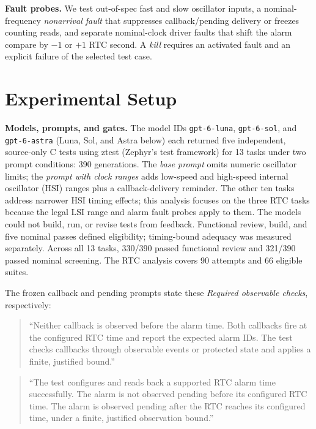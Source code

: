 \documentclass[sigconf,nonacm]{acmart}
\begin{document}
\textbf{Fault probes.} We test out-of-spec fast and slow oscillator inputs, a nominal-frequency \emph{nonarrival fault} that suppresses callback/pending delivery or freezes counting reads, and separate nominal-clock driver faults that shift the alarm compare by $-1$ or $+1$ RTC second. A \emph{kill} requires an activated fault and an explicit failure of the selected test case.

\section{Experimental Setup}

\textbf{Models, prompts, and gates.} The model IDs \texttt{gpt-6-luna}, \texttt{gpt-6-sol}, and \texttt{gpt-6-astra} (Luna, Sol, and Astra below) each returned five independent, source-only C tests using ztest (Zephyr's test framework) for 13 tasks under two prompt conditions: 390 generations. The \emph{base prompt} omits numeric oscillator limits; the \emph{prompt with clock ranges} adds low-speed and high-speed internal oscillator (HSI) ranges plus a callback-delivery reminder. The other ten tasks address narrower HSI timing effects; this analysis focuses on the three RTC tasks because the legal LSI range and alarm fault probes apply to them. The models could not build, run, or revise tests from feedback. Functional review, build, and five nominal passes defined eligibility; timing-bound adequacy was measured separately. Across all 13 tasks, 330/390 passed functional review and 321/390 passed nominal screening. The RTC analysis covers 90 attempts and 66 eligible suites.

The frozen callback and pending prompts state these \emph{Required observable checks}, respectively:
\begin{quote}\small
``Neither callback is observed before the alarm time. Both callbacks fire at the configured RTC time and report the expected alarm IDs. The test checks callbacks through observable events or protected state and applies a finite, justified bound.''
\end{quote}
\begin{quote}\small
``The test configures and reads back a supported RTC alarm time successfully. The alarm is not observed pending before its configured RTC time. The alarm is observed pending after the RTC reaches its configured time, under a finite, justified observation bound.''
\end{quote}
\end{document}
